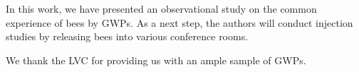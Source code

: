 \documentclass[aps,prl,preprint,groupedaddress,twocolumn]{revtex4-1}
\begin{document}
In this work, we have presented an observational study on the common
experience of bees by GWPs. As a next step, the authors will conduct
injection studies by releasing bees into various conference rooms.

We thank the LVC for providing us with an ample sample of GWPs.




%


\end{document}

